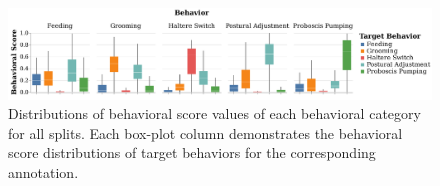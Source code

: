 \begin{figure}[ht!]
	\centering
	\includegraphics[width=\linewidth]{figures/BehavioralScoresDistributions_perBehavior.pdf}
	\caption[Distributions of behavioral score values of each behavioral category for all splits.]{Distributions of behavioral score values of each behavioral category for all splits.
		Each box-plot column demonstrates the behavioral score distributions of target behaviors for the corresponding annotation.}
\end{figure}

